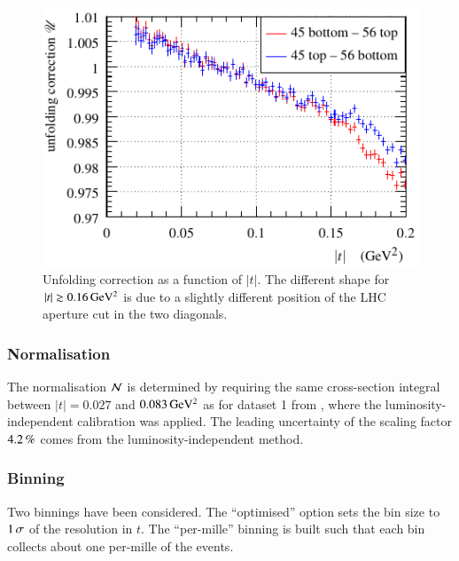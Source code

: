\begin{figure}
\begin{center}
\includegraphics{fig/unfolding_correction_comparison.pdf}
\vskip-3mm
\caption{%
Unfolding correction as a function of $|t|$. The different shape for $|t| \gtrsim 0.16\,{\rm GeV^2}$ is due to a slightly different position of the LHC aperture cut in the two diagonals.
}
\label{fig:unfolding}
\end{center}
\end{figure}


\subsubsection{Normalisation}
\label{sec:normalisation}

The normalisation ${\cal N}$ is determined by requiring the same cross-section integral between $|t| = 0.027$ and $0.083\,{\rm GeV^2}$ as for dataset 1 from \cite{prl111}, where the luminosity-independent calibration was applied. The leading uncertainty of the scaling factor $4.2\,{\rm \%}$ comes from the luminosity-independent method.




\subsubsection{Binning}
\label{sec:binning}

Two binnings have been considered. The ``optimised'' option sets the bin size to $1\,{\rm \sigma}$ of the resolution in $t$. The ``per-mille'' binning is built such that each bin collects about one per-mille of the events.


